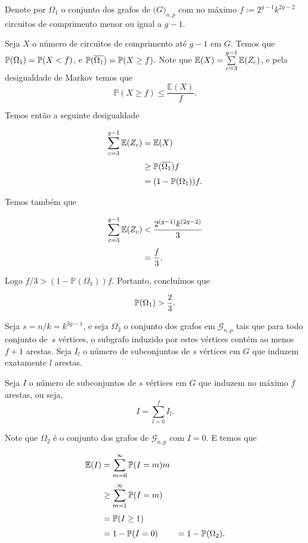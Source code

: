 Denote por $\Omega_1$ o conjunto dos grafos de $\mathbb(G)_{n,p}$ com no máximo $f := 2^{g-1}k^{2g-2}$ circuitos de comprimento menor ou igual a $g-1$.

Seja $X$ o número de circuitos de comprimento até $g-1$ em $G$. Temos que $\mathbb{P}(\Omega_1) = \mathbb{P}(X < f)$, e $\mathbb{P}(\overline{\Omega_1}) = \mathbb{P}(X\geq f)$. Note que $\mathbb{E}(X) = \sum\limits_{c=3}^{g-1}\mathbb{E}(Z_c)$, e pela desigualdade de Markov temos que \[\mathbb{P}(X \geq f) \leq \frac{\mathbb{E}(X)}{f}.\]

Temos então a seguinte desigualdade

\begin{equation*}
\setlength{\jot}{6pt}
\begin{aligned}
\sum\limits_{c=3}^{g-1}\bbe(Z_c) &= \bbe(X) \\ 
&\geq \bbp(\overline{\Omega_1})f \\
&= (1 - \bbp(\Omega_1))f.
\end{aligned}
\end{equation*}

Temos também que

\begin{equation*}
\setlength{\jot}{6pt}
\begin{aligned}
\sum\limits_{c=3}^{g-1}\bbe(Z_c) &< \frac{2^{(g-1)}k^{(2g-2)}}{3} \\
&= \frac{f}{3}.
\end{aligned}
\end{equation*}

Logo $f/3 > (1-\mathbb{P}(\Omega_1))f$. Portanto, concluímos que

\begin{equation}\label{teoerdosomega1}
\mathbb{P}(\Omega_1) > \frac{2}{3}.  
\end{equation}

Seja $s = n/k = k^{3g-1}$, e seja $\Omega_2$ o conjunto dos grafos em $\mathcal{G}_{n,p}$ tais que para todo conjunto de~$s$ vértices, o subgrafo induzido por estes vértices contém ao menos $f+1$ arestas. Seja $I_l$ o número de subconjuntos de $s$ vértices em $G$ que induzem exatamente $l$ arestas.

Seja $I$ o número de subconjuntos de $s$ vértices em $G$ que induzem no máximo $f$ arestas, ou seja, \[I = \sum\limits_{l=0}^{f}I_l.\]

Note que $\Omega_2$ é o conjunto dos grafos de $\mathcal{G}_{n,p}$ com $I = 0$. E temos que

\begin{equation*}
\setlength{\jot}{6pt}
\begin{aligned}
\bbe(I) &= \sum\limits_{m=0}^{\infty}\bbp(I = m)m \\
&\geq \sum\limits_{m=1}^{\infty}\bbp(I = m) \\
&= \bbp(I \geq 1) \\
&= 1 - \bbp(I = 0) &= 1 - \bbp(\Omega_2).
\end{aligned}
\end{equation*}

